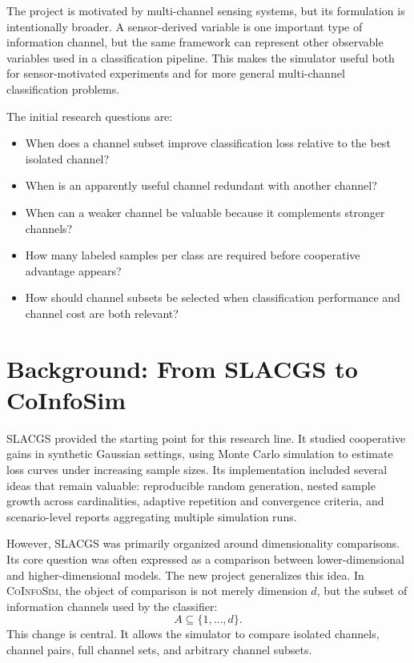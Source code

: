 \documentclass[11pt,a4paper]{article}
\newcommand{\CoInfoSim}{\textsc{CoInfoSim}}
\newcommand{\SLACGS}{\textsc{SLACGS}}
\begin{document}
The project is motivated by multi-channel sensing systems, but its formulation is intentionally broader. A sensor-derived variable is one important type of information channel, but the same framework can represent other observable variables used in a classification pipeline. This makes the simulator useful both for sensor-motivated experiments and for more general multi-channel classification problems.

The initial research questions are:
\begin{itemize}
    \item When does a channel subset improve classification loss relative to the best isolated channel?
    \item When is an apparently useful channel redundant with another channel?
    \item When can a weaker channel be valuable because it complements stronger channels?
    \item How many labeled samples per class are required before cooperative advantage appears?
    \item How should channel subsets be selected when classification performance and channel cost are both relevant?
\end{itemize}

\section{Background: From SLACGS to CoInfoSim}

\SLACGS{} provided the starting point for this research line. It studied cooperative gains in synthetic Gaussian settings, using Monte Carlo simulation to estimate loss curves under increasing sample sizes. Its implementation included several ideas that remain valuable: reproducible random generation, nested sample growth across cardinalities, adaptive repetition and convergence criteria, and scenario-level reports aggregating multiple simulation runs.

However, \SLACGS{} was primarily organized around dimensionality comparisons. Its core question was often expressed as a comparison between lower-dimensional and higher-dimensional models. The new project generalizes this idea. In \CoInfoSim{}, the object of comparison is not merely dimension $d$, but the subset of information channels used by the classifier:
\[
    A \subseteq \{1,\ldots,d\}.
\]
This change is central. It allows the simulator to compare isolated channels, channel pairs, full channel sets, and arbitrary channel subsets.
\end{document}

